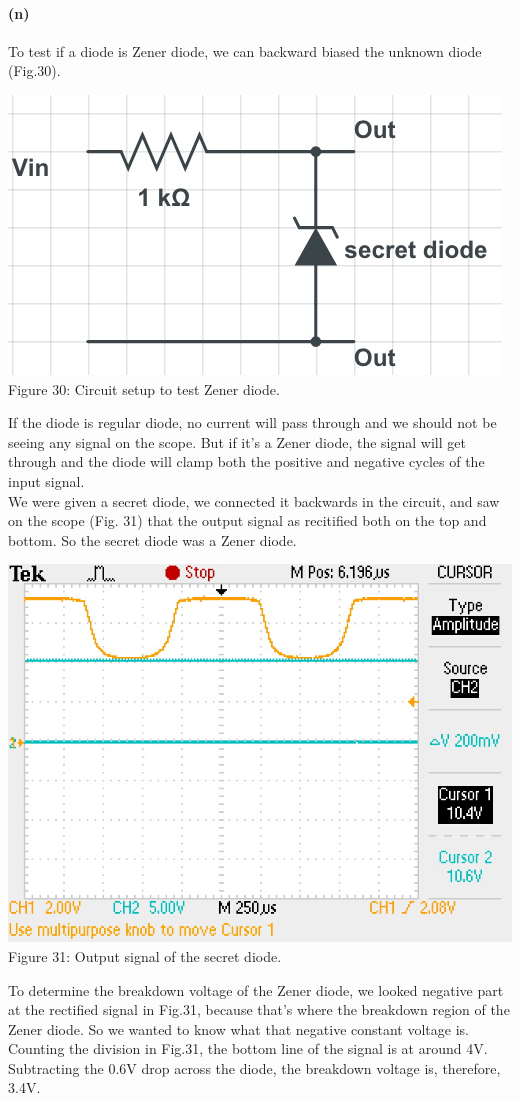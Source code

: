 \documentclass[]{article}
\begin{document}
	\paragraph{ (n)} 	 	
To test if a diode is Zener diode, we can backward biased the unknown diode (Fig.30). 
\begin{center}
	\includegraphics[scale=0.4]{n_circuit}\\
	Figure 30: Circuit setup to test Zener diode. 
\end{center}
If the diode is regular diode, no current will pass through and we should not be seeing any signal on the scope. But if it's a Zener diode, the signal will get through and the diode will clamp both the positive and negative cycles of the input signal. 
\\We were given a secret diode, we connected it backwards in the circuit, and saw on the scope (Fig. 31) that the output signal as recitified both on the top and bottom.  So the secret diode was a Zener diode. 
\begin{center}
	\includegraphics[scale=0.8]{n_zener}\\
	Figure 31: Output signal of the secret diode.
\end{center}
To determine the breakdown voltage of the Zener diode, we looked negative part at the rectified signal in Fig.31, because that's where the breakdown region of the Zener diode. So we wanted to know what that negative constant voltage is. Counting the division in Fig.31, the bottom line of the signal is at around 4V. Subtracting the 0.6V drop across the diode, the breakdown voltage is, therefore, 3.4V. 
\end{document}
